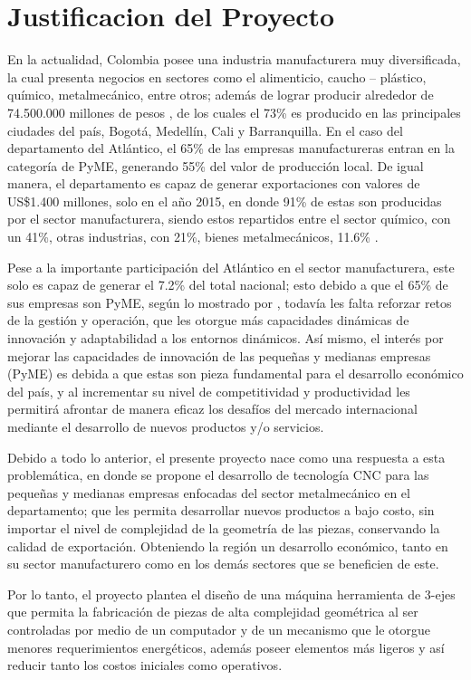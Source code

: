 \section{Justificacion del Proyecto}
    En la actualidad, Colombia posee una industria manufacturera muy diversificada, la cual presenta negocios en sectores como el alimenticio, caucho – plástico, químico, metalmecánico, entre otros; además de lograr producir alrededor de 74.500.000 millones de pesos \citep{DANE2015}, de los cuales el 73\% es producido en las principales ciudades del país, Bogotá, Medellín, Cali y Barranquilla. En el caso del departamento del Atlántico, el 65\% de las empresas manufactureras entran en la categoría de PyME, generando 55\% del valor de producción local. De igual manera, el departamento es capaz de generar exportaciones con valores de US\$1.400 millones, solo en el año 2015, en donde 91\% de estas son producidas por el sector manufacturera, siendo estos repartidos entre el sector químico, con un 41\%, otras industrias, con 21\%, bienes metalmecánicos, 11.6\% \citep{lechuga2018analisis}.
    
    Pese a la importante participación del Atlántico en el sector manufacturera, este solo es capaz de generar el 7.2\% del total nacional; esto debido a que el 65\% de sus empresas son PyME, según lo mostrado por \cite{camargo2017capacidad}, todavía les falta reforzar retos de la gestión y operación, que les otorgue más capacidades dinámicas de innovación y adaptabilidad a los entornos dinámicos. Así mismo, el interés por mejorar las capacidades de innovación de las pequeñas y medianas empresas (PyME) es debida a que estas son pieza fundamental para el desarrollo económico del país, y al incrementar su nivel de competitividad y productividad les permitirá afrontar de manera eficaz los desafíos del mercado internacional mediante el desarrollo de nuevos productos y/o servicios.
    
    Debido a todo lo anterior, el presente proyecto nace como una respuesta a esta problemática, en donde se propone el desarrollo de tecnología CNC para las pequeñas y medianas empresas enfocadas del sector metalmecánico en el departamento; que les permita desarrollar nuevos productos a bajo costo, sin importar el nivel de complejidad de la geometría de las piezas, conservando la calidad de exportación. Obteniendo la región un desarrollo económico, tanto en su sector manufacturero como en los demás sectores que se beneficien de este. 
    
    Por lo tanto, el proyecto plantea el diseño de una máquina herramienta de 3-ejes que permita la fabricación de piezas de alta complejidad geométrica al ser controladas por medio de un computador y de un mecanismo que le otorgue menores requerimientos energéticos, además poseer elementos más ligeros y así reducir tanto los costos iniciales como operativos.
    
